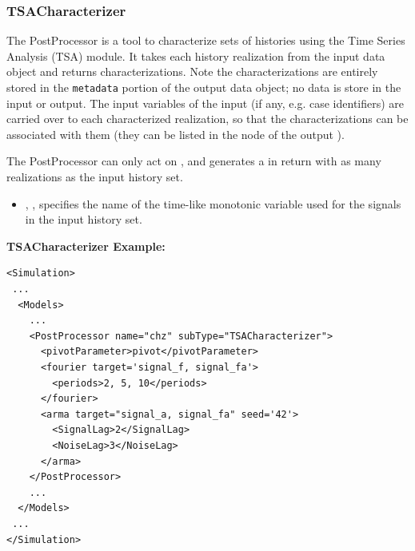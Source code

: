 \subsubsection{TSACharacterizer}
\label{TSACharacterizer}
The  PostProcessor is a tool to characterize sets of histories using
the Time Series Analysis (TSA) module. It takes each history realization from the input data object
and returns characterizations. Note the characterizations are entirely stored in the \texttt{metadata}
portion of the output data object; no data is store in the input or output.
The input variables of the input  (if any, e.g. case identifiers) are carried over to
each characterized realization, so that the characterizations can be associated with them
(they can be listed in the  node of the output ).

The  PostProcessor can only act on  ,
and generates a   in return with as many realizations as the input
history set.

%
\begin{itemize}
  \item {}, , specifies the name of the time-like
    monotonic variable used for the signals in the input history set.
\end{itemize}

\tsaList

\textbf{TSACharacterizer Example:}

\begin{lstlisting}[style=XML]
<Simulation>
 ...
  <Models>
    ...
    <PostProcessor name="chz" subType="TSACharacterizer">
      <pivotParameter>pivot</pivotParameter>
      <fourier target='signal_f, signal_fa'>
        <periods>2, 5, 10</periods>
      </fourier>
      <arma target="signal_a, signal_fa" seed='42'>
        <SignalLag>2</SignalLag>
        <NoiseLag>3</NoiseLag>
      </arma>
    </PostProcessor>
    ...
  </Models>
 ...
</Simulation>
\end{lstlisting}
